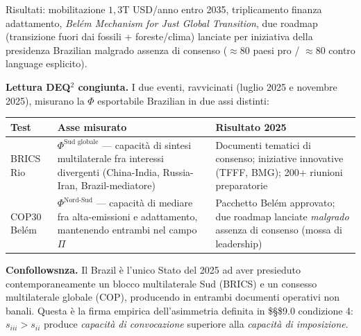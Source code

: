 Risultati: mobilitazione \(1{,}3\)T USD/anno entro 2035, triplicamento
finanza adattamento, \emph{Belém Mechanism for Just Global Transition},
due roadmap (transizione fuori dai fossili + foreste/clima) lanciate per
iniziativa della presidenza Brazilian malgrado assenza di consenso
(\(\approx 80\) paesi pro / \(\approx 80\) contro language esplicito).

\Hypoth{} \textbf{Lettura DEQ$^2$ congiunta.} I due eventi, ravvicinati
(luglio 2025 e novembre 2025), misurano la \(\Phi\) esportabile
Brazilian in due assi distinti:

{\def\LTcaptype{none} %
{\small\begin{longtable}[]{@{}
  >{\raggedright\arraybackslash}p{}
  >{\raggedright\arraybackslash}p{}
  >{\raggedright\arraybackslash}p{}@{}}
\toprule\noalign{}
\begin{minipage}[b]{\linewidth}\raggedright
Test
\end{minipage} & \begin{minipage}[b]{\linewidth}\raggedright
Asse misurato
\end{minipage} & \begin{minipage}[b]{\linewidth}\raggedright
Risultato 2025
\end{minipage} \\
\midrule\noalign{}
\endhead
\bottomrule\noalign{}
\endlastfoot
BRICS Rio & \(\Phi^{\text{Sud globale}}\) --- capacità di sintesi
multilaterale fra interessi divergenti (China-India, Russia-Iran,
Brazil-mediatore) & Documenti tematici di consenso; iniziative
innovative (TFFF, BMG); 200+ riunioni preparatorie \\
COP30 Belém & \(\Phi^{\text{Nord-Sud}}\) --- capacità di mediare fra
alta-emissioni e adattamento, mantenendo entrambi nel campo \(\Pi\) &
Pacchetto Belém approvato; due roadmap lanciate \emph{malgrado} assenza
di consenso (mossa di leadership) \\
\end{longtable}}
}

\Proved{} \textbf{Confollowsnza.} Il Brazil è l'unico Stato del 2025 ad
aver presieduto contemporaneamente un blocco multilaterale Sud (BRICS) e
un consesso multilaterale globale (COP), producendo in entrambi
documenti operativi non banali. Questa è la firma empirica
dell'asimmetria definita in \$\S\$9.0 condizione 4: \(s_{iii} > s_{ii}\)
produce \emph{capacità di convocazione} superiore alla \emph{capacità di
imposizione}.

